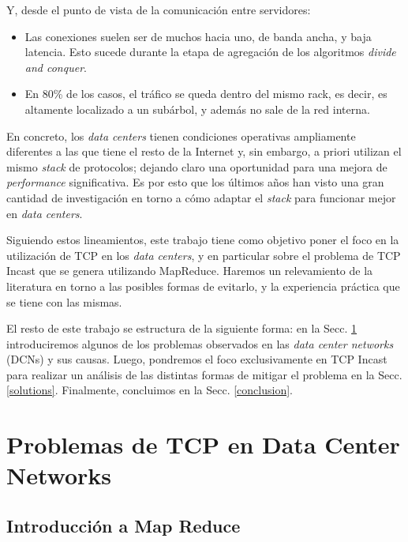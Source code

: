\documentclass[runningheads,a4paper]{llncs}
\begin{document}
Y, desde el punto de vista de la comunicación entre servidores:

\begin{itemize}
    \item Las conexiones suelen ser de muchos hacia uno, de banda ancha, y baja latencia. Esto sucede durante la etapa de agregación de los algoritmos \textit{divide and conquer}.
    
    \item En 80\% de los casos, el tráfico se queda dentro del mismo rack, es decir, es altamente localizado a un subárbol, y además no sale de la red interna.
\end{itemize}

En concreto, los \textit{data centers} tienen condiciones operativas ampliamente diferentes a las que tiene el resto de la Internet y, sin embargo, a priori utilizan el mismo \textit{stack} de protocolos; dejando claro una oportunidad para una mejora de \textit{performance} significativa. Es por esto que los últimos años han visto una gran cantidad de investigación en torno a cómo adaptar el \textit{stack} para funcionar mejor en \textit{data centers}.

Siguiendo estos lineamientos, este trabajo tiene como objetivo poner el foco en la utilización de TCP en los \textit{data centers}, y en particular sobre el problema de TCP Incast que se genera utilizando MapReduce. Haremos un relevamiento de la literatura en torno a las posibles formas de evitarlo, y la experiencia práctica que se tiene con las mismas.

El resto de este trabajo se estructura de la siguiente forma: en la Secc. \ref{problems} introduciremos algunos de los problemas observados en las \textit{data center networks} (DCNs) y sus causas. Luego, pondremos el foco exclusivamente en TCP Incast para realizar un análisis de las distintas formas de mitigar el problema en la Secc. \ref{solutions}. Finalmente, concluimos en la Secc. \ref{conclusion}. 

\newpage

\section{Problemas de TCP en Data Center Networks} \label{problems}

\subsection{Introducción a Map Reduce}
\end{document}
